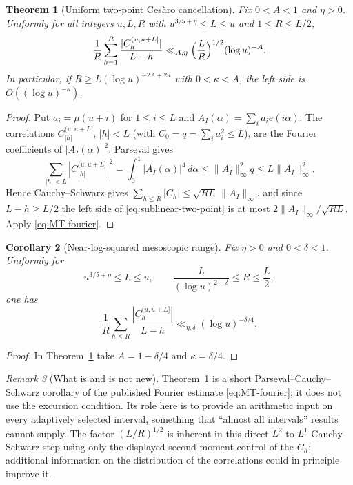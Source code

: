 \documentclass[11pt]{amsart}
\numberwithin{equation}{section}
\theoremstyle{plain}
\newtheorem{theorem}{Theorem}[section]
\newtheorem{corollary}[theorem]{Corollary}
\theoremstyle{definition}
\theoremstyle{remark}
\newtheorem{remark}[theorem]{Remark}
\begin{document}
\begin{theorem}[Uniform two-point Ces\`aro cancellation]
\label{thm:sublinear-two-point}
Fix $0<A<1$ and $\eta>0$. Uniformly for all integers $u,L,R$ with
$u^{3/5+\eta}\le L\le u$ and $1\le R\le L/2$,
\begin{equation}
\label{eq:sublinear-two-point}
\frac1R\sum_{h=1}^{R}\frac{|C^{(u,u+L]}_h|}{L-h}
\ll_{A,\eta}\Bigl(\frac LR\Bigr)^{1/2}(\log u)^{-A}.
\end{equation}
In particular, if $R\ge L(\log u)^{-2A+2\kappa}$ with
$0<\kappa<A$, the left side is $O((\log u)^{-\kappa})$.
\end{theorem}

\begin{proof}
Put $a_i=\mu(u+i)$ for $1\le i\le L$ and
$A_I(\alpha)=\sum_ia_ie(i\alpha)$. The correlations
$C^{(u,u+L]}_{|h|}$, $|h|<L$ (with $C_0=q=\sum_ia_i^2\le L$), are the
Fourier coefficients of $|A_I(\alpha)|^2$. Parseval gives
\[
\sum_{|h|<L}|C^{(u,u+L]}_{|h|}|^2
=\int_0^1|A_I(\alpha)|^4\,d\alpha
\le\|A_I\|_\infty^2q\le L\|A_I\|_\infty^2.
\]
Hence Cauchy--Schwarz gives
$\sum_{h\le R}|C_h|\le\sqrt{RL}\,\|A_I\|_\infty$, and since
$L-h\ge L/2$ the left side of \eqref{eq:sublinear-two-point} is at most
$2\|A_I\|_\infty/\sqrt{RL}$. Apply \eqref{eq:MT-fourier}.
\end{proof}

\begin{corollary}[Near-log-squared mesoscopic range]
\label{cor:near-log2-lags}
Fix $\eta>0$ and $0<\delta<1$. Uniformly for
\[
u^{3/5+\eta}\le L\le u,
\qquad
\frac{L}{(\log u)^{2-\delta}}\le R\le\frac L2,
\]
one has
\[
\frac1R\sum_{h\le R}\frac{|C^{(u,u+L]}_h|}{L-h}
\ll_{\eta,\delta}(\log u)^{-\delta/4}.
\]
\end{corollary}

\begin{proof}
In Theorem~\ref{thm:sublinear-two-point} take
$A=1-\delta/4$ and $\kappa=\delta/4$.
\end{proof}

\begin{remark}[What is and is not new]
\label{rem:sublinear-status}
Theorem~\ref{thm:sublinear-two-point} is a short Parseval--Cauchy--Schwarz
corollary of the published Fourier estimate \eqref{eq:MT-fourier}; it does
not use the excursion condition. Its role here is to provide an arithmetic
input on every adaptively selected interval, something that ``almost all
intervals'' results cannot supply. The factor $(L/R)^{1/2}$ is inherent in
this direct $L^2$-to-$L^1$ Cauchy--Schwarz step using only the displayed
second-moment control of the $C_h$; additional information on the
distribution of the correlations could in principle improve it.
\end{remark}
\end{document}
